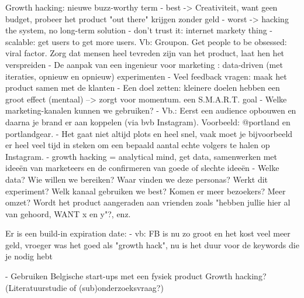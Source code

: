 Growth hacking: nieuwe buzz-worthy term
- best -> Creativiteit, want geen budget, probeer het product "out there" krijgen zonder geld
- worst -> hacking the system, no long-term solution
- don't trust it: internet markety thing
- scalable: get users to get more users. Vb: Groupon. Get people to be obsessed: viral factor. Zorg dat mensen heel tevreden zijn van het product, laat hen het verspreiden
- De aanpak van een ingenieur voor marketing : data-driven (met iteraties, opnieuw en opnieuw) experimenten
- Veel feedback vragen: maak het product samen met de klanten
- Een doel zetten: kleinere doelen hebben een groot effect (mentaal) --> zorgt voor momentum. een S.M.A.R.T. goal
- Welke marketing-kanalen kunnen we gebruiken?
- Vb.: Eerst een audience opbouwen en daarna je brand er aan koppelen (via bvb Instagram). Voorbeeld: @portland en portlandgear.
- Het gaat niet altijd plots en heel snel, vaak moet je bijvoorbeeld er heel veel tijd in steken om een bepaald aantal echte volgers te halen op Instagram. 
- growth hacking = analytical mind, get data, samenwerken met ideeën van marketeers en de confirmeren van goede of slechte ideeën
- Welke data? Wie willen we bereiken? Waar vinden we deze personas? Werkt dit experiment? Welk kanaal gebruiken we best? Komen er meer bezoekers? Meer omzet? Wordt het product aangeraden aan vrienden zoals "hebben jullie hier al van gehoord, WANT x en y"?, enz.


Er is een build-in expiration date:
- vb: FB is nu zo groot en het kost veel meer geld, vroeger was het goed als "growth hack", nu is het duur voor de keywords die je nodig hebt



- Gebruiken Belgische start-ups met een fysiek product Growth hacking? (Literatuurstudie of (sub)onderzoeksvraag?)
